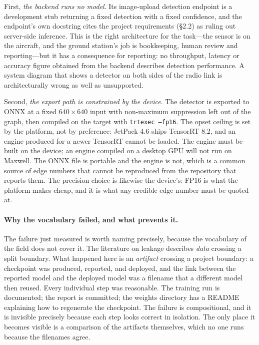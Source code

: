 First, \emph{the backend runs no model}. Its image-upload detection endpoint is a
development stub returning a fixed detection with a fixed confidence, and the
endpoint's own docstring cites the project requirements (\S2.2) as ruling out
server-side inference. This is the right architecture for the task---the sensor is
on the aircraft, and the ground station's job is bookkeeping, human review and
reporting---but it has a consequence for reporting: no throughput, latency or
accuracy figure obtained from the backend describes detection performance. A
system diagram that shows a detector on both sides of the radio link is
architecturally wrong as well as unsupported.

Second, \emph{the export path is constrained by the device}. The detector is
exported to ONNX at a fixed $640\times640$ input with non-maximum suppression left
out of the graph, then compiled on the target with \texttt{trtexec --fp16}. The
opset ceiling is set by the platform, not by preference: JetPack 4.6 ships
TensorRT 8.2, and an engine produced for a newer TensorRT cannot be loaded. The
engine must be built on the device; an engine compiled on a desktop GPU will not
run on Maxwell. The ONNX file is portable and the engine is not, which is a common
source of edge numbers that cannot be reproduced from the repository that reports
them. The precision choice is likewise the device's: FP16 is what the platform
makes cheap, and it is what any credible edge number must be quoted at.

\paragraph{Why the vocabulary failed, and what prevents it.} The failure just
measured is worth naming precisely, because the vocabulary of the field does not
cover it. The literature on leakage describes \emph{data} crossing a split
boundary. What happened here is an \emph{artifact} crossing a project boundary: a
checkpoint was produced, reported, and deployed, and the link between the reported
model and the deployed model was a filename that a different model then reused.
Every individual step was reasonable. The training run is documented; the report is
committed; the weights directory has a README explaining how to regenerate the
checkpoint. The failure is compositional, and it is invisible precisely because
each step looks correct in isolation. The only place it becomes visible is a
comparison of the artifacts themselves, which no one runs because the filenames
agree.

